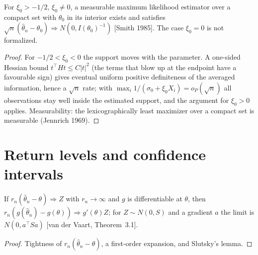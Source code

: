 \begin{theorem}
  \label{thm:gpd-joint-normality-all}
  \leanok
  For $\xi_0 > -1/2$, $\xi_0 \ne 0$, a measurable maximum likelihood estimator over a compact set with $\theta_0$ in its interior
  exists and satisfies $\sqrt n(\hat\theta_n - \theta_0) \Rightarrow N(0, I(\theta_0)^{-1})$ [Smith 1985]. The case $\xi_0 = 0$ is not
  formalized.
\end{theorem}
\begin{proof}
  \leanok
  For $-1/2 < \xi_0 < 0$ the support moves with the parameter. A one-sided Hessian bound $t^\top H t \le C|t|^2$ (the terms
  that blow up at the endpoint have a favourable sign) gives eventual uniform positive definiteness of the averaged
  information, hence a $\sqrt n$ rate; with $\max_i 1/(\sigma_0 + \xi_0 X_i) = o_P(\sqrt n)$ all observations stay well inside the
  estimated support, and the argument for $\xi_0 > 0$ applies. Measurability: the lexicographically least maximizer over a
  compact set is measurable (Jennrich 1969).
\end{proof}

\section{Return levels and confidence intervals}

\begin{theorem}
  \label{thm:delta-method}
  \leanok
  If $r_n(\hat\theta_n - \theta) \Rightarrow Z$ with $r_n \to \infty$ and $g$ is differentiable at $\theta$, then
  $r_n(g(\hat\theta_n) - g(\theta)) \Rightarrow g'(\theta) Z$; for $Z \sim N(0, S)$ and a gradient $a$ the limit is $N(0, a^\top S a)$
  [van der Vaart, Theorem~3.1].
\end{theorem}
\begin{proof}
  \leanok
  Tightness of $r_n(\hat\theta_n - \theta)$, a first-order expansion, and Slutsky's lemma.
\end{proof}

